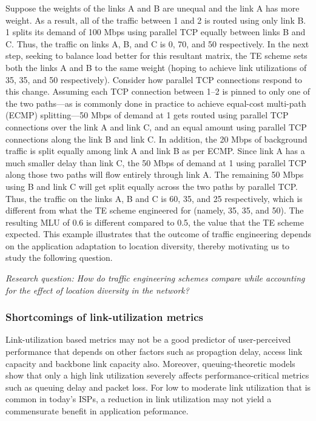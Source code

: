 Suppose the weights of the links A and B are unequal and the link A has more weight. As a result, all of the traffic between 1 and 2 is routed using only link B. 1 splits its demand of 100 Mbps using parallel TCP equally between links B and C. Thus, the traffic on links A, B, and C is  0, 70, and 50 respectively. In the next step, seeking to balance load better for this resultant matrix, the TE scheme sets both the links A and B to the same weight (hoping to achieve link utilizations of 35, 35, and 50 respectively).  Consider how parallel TCP connections respond to this change. Assuming each TCP connection between 1--2 is pinned to only one of the two paths---as is commonly done in practice to achieve equal-cost multi-path (ECMP) splitting---50 Mbps of demand at 1 gets routed using parallel TCP connections over the link A and link C, and an equal amount using parallel TCP connections along the link B and link C. In addition, the 20 Mbps of background traffic is split equally among link A and link B as per ECMP.  Since link A has a much smaller delay than link C, the 50 Mbps of demand at 1 using parallel TCP along those two paths will flow entirely through link A. The remaining 50 Mbps using B and link C will get split equally across the two paths by parallel TCP. Thus, the traffic on the links A, B and C is 60, 35, and 25 respectively, which is different from what the TE scheme engineered for (namely, 35, 35, and 50). The resulting MLU of 0.6 is different compared to 0.5, the value that the TE scheme expected. This example illustrates that the outcome of traffic engineering depends on the application adaptation to location diversity, thereby motivating us to study the following question.

\emph{Research question: How do traffic engineering schemes compare while accounting for the effect of location diversity in the network?}

\subsubsection{Shortcomings of link-utilization metrics}
\label{sec:bg-poormlu}


Link-utilization based metrics may not be a good predictor of user-perceived performance that depends on other factors such as propagtion delay, access link capacity and backbone link capacity also. Moreover, queuing-theoretic models show that only a high link utilization severely affects performance-critical metrics such as queuing delay and packet loss. For low to moderate link utilization that is common in today's ISPs, a reduction in link utilization may not yield a commensurate benefit in application peformance. 

